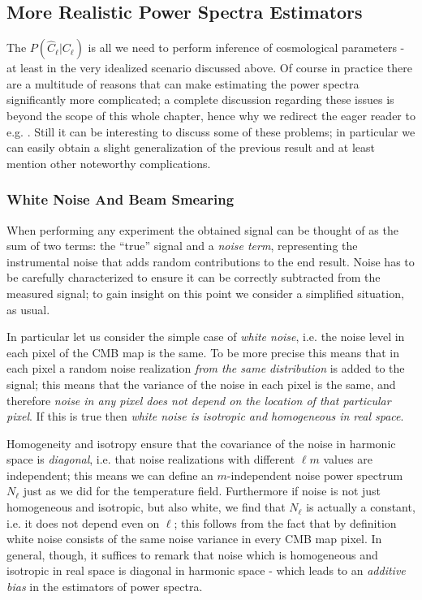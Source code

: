 \subsection{More Realistic Power Spectra Estimators}
The $P(\hat{C}_\ell|C_\ell)$ is all we need to perform inference of cosmological parameters - at least in the very idealized scenario discussed above. 
Of course in practice there are a multitude of reasons that can make estimating the power spectra significantly more complicated; a complete discussion regarding these issues is beyond the scope of this whole chapter, hence why we redirect the eager reader to e.g. \cite{likelihood_cmb}.
Still it can be interesting to discuss some of these problems; in particular we can easily obtain a slight generalization of the previous result and at least mention other noteworthy complications.


\subsubsection{White Noise And Beam Smearing}
When performing any experiment the obtained signal can be thought of as the sum of two terms: the ``true'' signal and a \emph{noise term}, representing the instrumental noise that adds random contributions to the end result. Noise has to be carefully characterized to ensure it can be correctly subtracted from the measured signal; to gain insight on this point we consider a simplified situation, as usual.

In particular let us consider the simple case of \emph{white noise}, i.e. the noise level in each pixel of the CMB map is the same. To be more precise this means that in each pixel a random noise realization \emph{from the same distribution} is added to the signal; this means that the variance of the noise in each pixel is the same, and therefore \emph{noise in any pixel does not depend on the location of that particular pixel}. If this is true then \emph{white noise is isotropic and homogeneous in real space}.

Homogeneity and isotropy ensure that the covariance of the noise in harmonic space is \emph{diagonal}, i.e. that noise realizations with different $\ell m$ values are independent; this means we can define an $m$-independent noise power spectrum $N_\ell$ just as we did for the temperature field.
Furthermore if noise is not just homogeneous and isotropic, but also white, we find that $N_\ell$ is actually a constant, i.e. it does not depend even on $\ell$; this follows from the fact that by definition white noise consists of the same noise variance in every CMB map pixel. 
In general, though, it suffices to remark that noise which is homogeneous and isotropic in real space is diagonal in harmonic space - which leads to an \emph{additive bias} in the estimators of power spectra.

